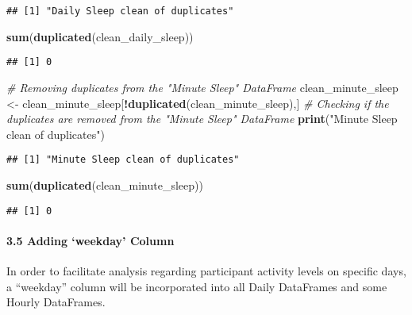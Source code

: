 \documentclass[
]{article}
\newenvironment{Shaded}{\begin{snugshade}}{\end{snugshade}}
\newcommand{\CommentTok}[1]{\textcolor[rgb]{0.56,0.35,0.01}{\textit{#1}}}
\newcommand{\FunctionTok}[1]{\textcolor[rgb]{0.13,0.29,0.53}{\textbf{#1}}}
\newcommand{\NormalTok}[1]{#1}
\newcommand{\OtherTok}[1]{\textcolor[rgb]{0.56,0.35,0.01}{#1}}
\newcommand{\SpecialCharTok}[1]{\textcolor[rgb]{0.81,0.36,0.00}{\textbf{#1}}}
\newcommand{\StringTok}[1]{\textcolor[rgb]{0.31,0.60,0.02}{#1}}
\begin{document}
\begin{verbatim}
## [1] "Daily Sleep clean of duplicates"
\end{verbatim}

\begin{Shaded}
\begin{Highlighting}[]
\FunctionTok{sum}\NormalTok{(}\FunctionTok{duplicated}\NormalTok{(clean\_daily\_sleep))}
\end{Highlighting}
\end{Shaded}

\begin{verbatim}
## [1] 0
\end{verbatim}

\begin{Shaded}
\begin{Highlighting}[]
\CommentTok{\# Removing duplicates from the "Minute Sleep" DataFrame}
\NormalTok{clean\_minute\_sleep }\OtherTok{\textless{}{-}}\NormalTok{ clean\_minute\_sleep[}\SpecialCharTok{!}\FunctionTok{duplicated}\NormalTok{(clean\_minute\_sleep),]}
\CommentTok{\# Checking if the duplicates are removed from the "Minute Sleep" DataFrame}
\FunctionTok{print}\NormalTok{(}\StringTok{"Minute Sleep clean of duplicates"}\NormalTok{)}
\end{Highlighting}
\end{Shaded}

\begin{verbatim}
## [1] "Minute Sleep clean of duplicates"
\end{verbatim}

\begin{Shaded}
\begin{Highlighting}[]
\FunctionTok{sum}\NormalTok{(}\FunctionTok{duplicated}\NormalTok{(clean\_minute\_sleep))}
\end{Highlighting}
\end{Shaded}

\begin{verbatim}
## [1] 0
\end{verbatim}

\hypertarget{adding-weekday-column}{%
\paragraph{3.5 Adding `weekday' Column}\label{adding-weekday-column}}

In order to facilitate analysis regarding participant activity levels on
specific days, a ``weekday'' column will be incorporated into all Daily
DataFrames and some Hourly DataFrames.
\end{document}
